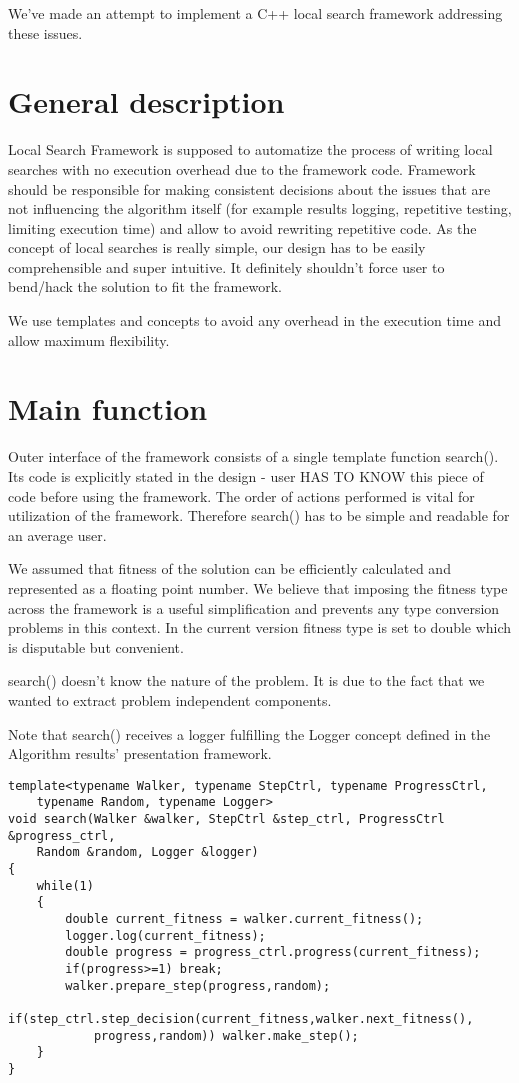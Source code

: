 We've made an attempt to implement a C++ local search 
framework addressing these issues.

\section{General description}

Local Search Framework is supposed to automatize the process of writing local searches with no execution overhead due to the framework code.
Framework should be responsible for making consistent decisions about the issues that are not influencing the algorithm itself
(for example results logging, repetitive testing, limiting execution time) and allow to avoid rewriting repetitive code.
As the concept of local searches is really simple, our design has to be easily comprehensible and super intuitive.
It definitely shouldn't force user to bend/hack the solution to fit the framework.

We use templates and concepts to avoid any overhead in the execution time and allow maximum flexibility.

\section{Main function}

Outer interface of the framework consists of a single template function search().
Its code is explicitly stated in the design - user HAS TO KNOW this piece of code before using the framework.
The order of actions performed is vital for utilization of the framework.
Therefore search() has to be simple and readable for an average user.

We assumed that fitness of the solution can be efficiently calculated and represented as a floating point number.
We believe that imposing the fitness type across the framework is a useful simplification and prevents any type
conversion problems in this context. In the current version fitness type is set to double which is disputable but convenient.

search() doesn't know the nature of the problem.
It is due to the fact that we wanted to extract problem independent components.

Note that search() receives a logger fulfilling the Logger concept defined in the Algorithm
results' presentation framework.


\begin{lstlisting}
template<typename Walker, typename StepCtrl, typename ProgressCtrl,
	typename Random, typename Logger>
void search(Walker &walker, StepCtrl &step_ctrl, ProgressCtrl &progress_ctrl,
	Random &random, Logger &logger)
{
	while(1)
	{
		double current_fitness = walker.current_fitness();
		logger.log(current_fitness);
		double progress = progress_ctrl.progress(current_fitness);
		if(progress>=1) break;
		walker.prepare_step(progress,random);
		if(step_ctrl.step_decision(current_fitness,walker.next_fitness(),
			progress,random)) walker.make_step();
	}
}
\end{lstlisting}

